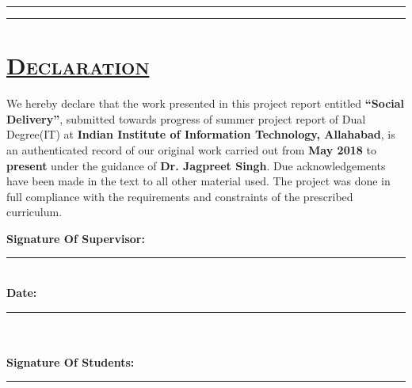 \documentclass{report}
\begin{document}
\begin{titlepage}
\hfill


	\rule{\textwidth}{0.4pt} %
	
	\vspace{2pt}\vspace{-\baselineskip} %
	
	\rule{\textwidth}{2pt} %
	
\end{titlepage}
\pagebreak


{\chapter*{ \quad \quad \quad \quad \quad \quad  \Huge \scshape \underline {Declaration} }
\vspace{2.0cm}
\begin{spacing}{0.3}
\fontsize{17}{68}\selectfont\linespread{10} {We hereby declare that the work presented in this project report entitled \textbf{``Social Delivery''},  submitted towards progress of summer project report of Dual Degree(IT) at \textbf{Indian Institute of Information Technology, Allahabad}, is an authenticated record of our original work carried out from \textbf{May 2018} to \textbf{present} under the guidance of \textbf{Dr. Jagpreet Singh}. Due acknowledgements have been made in the text to all other material used. The project was done in full compliance with the requirements and constraints of the prescribed curriculum.}
\end{spacing}
\vspace{3cm}
\Large
\noindent \textbf{Signature Of Supervisor:}\\
\rule[0.5em]{25em}{0.5pt} %
\vspace{1cm}\\
\noindent \textbf{Date:}\\
\rule[0.5em]{25em}{0.5pt}\\ %
\vspace{1cm}\\
\noindent \textbf{Signature Of Students:}\\
\rule[0.5em]{12em}{0.5pt} %
\vspace{1.5cm}\\

}
\end{document}
